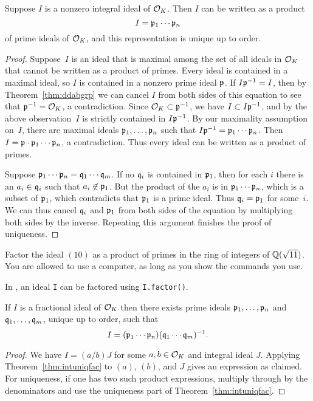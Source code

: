 \begin{theorem}\label{thm:intuniqfac}
	Suppose $I$ is a nonzero integral ideal of $\mathcal{O}_K$.  Then $I$ can
	be written as a product
	$$
		I = \mathfrak{p}_1\cdots \mathfrak{p}_n
	$$
	of prime ideals of $\mathcal{O}_K$, and this representation is unique up to
	order.
\end{theorem}
\begin{proof}
	Suppose~$I$ is an ideal that is maximal among the set of all ideals in
	$\mathcal{O}_K$ that cannot be written as a product of primes.  Every ideal is
	contained in a maximal ideal, so $I$ is contained in a nonzero prime
	ideal $\mathfrak{p}$.  If $I\mathfrak{p}^{-1} = I$, then by Theorem~\ref{thm:ddabgrp} we
	can cancel $I$ from both sides of this equation to see that
	$\mathfrak{p}^{-1}=\mathcal{O}_K$, a contradiction.  Since $\mathcal{O}_K\subset \mathfrak{p}^{-1}$,
	we have $I\subset I\mathfrak{p}^{-1}$, and by the above observation~$I$
	is strictly contained in $I\mathfrak{p}^{-1}$.
	By our maximality assumption on~$I$, there are maximal
	ideals $\mathfrak{p}_1,\ldots, \mathfrak{p}_n$ such that $I\mathfrak{p}^{-1} = \mathfrak{p}_1\cdots \mathfrak{p}_n$.
	Then $I=\mathfrak{p}\cdot \mathfrak{p}_1\cdots \mathfrak{p}_n$, a contradiction.  Thus every ideal
	can be written as a product of primes.
	
	Suppose $\mathfrak{p}_1\cdots \mathfrak{p}_n=\mathfrak{q}_1\cdots \mathfrak{q}_m$. If no $\mathfrak{q}_i$ is contained in
	$\mathfrak{p}_1$, then for each $i$ there is an $a_i\in \mathfrak{q}_i$ such that
	$a_i\not\in\mathfrak{p}_1$.  But the product of the $a_i$ is in $\mathfrak{p}_1\cdots
	\mathfrak{p}_n$, which is a subset of $\mathfrak{p}_1$, which contradicts that
	$\mathfrak{p}_1$ is a prime ideal.  Thus $\mathfrak{q}_i=\mathfrak{p}_1$ for some~$i$.  We can thus
	cancel $\mathfrak{q}_i$ and $\mathfrak{p}_1$ from both sides of the equation by multiplying
	both sides by the inverse.
	Repeating this argument finishes the proof of uniqueness.
\end{proof}

\begin{exercise}
	Factor the ideal $(10)$ as a product of primes
	in the ring of integers of $\mathbb{Q}(\sqrt{11})$. You are allowed
	to use a computer, as long as you show the commands you use.
	\begin{hint}
		In \sage, an ideal {\tt I} can be factored using {\tt I.factor()}.
	\end{hint}
\end{exercise}

\begin{theorem}\label{thm:uniqfac}
	If $I$ is a fractional ideal of $\mathcal{O}_K$ then there exists
	prime ideals $\mathfrak{p}_1,\ldots, \mathfrak{p}_n$ and $\mathfrak{q}_1,\ldots, \mathfrak{q}_m$,
	unique up to order, such that
	$$
		I = (\mathfrak{p}_1\cdots \mathfrak{p}_n)(\mathfrak{q}_1\cdots \mathfrak{q}_m)^{-1}.
	$$
\end{theorem}
\begin{proof}
	We have $I=(a/b)J$ for some $a,b\in\mathcal{O}_K$ and integral ideal $J$.
	Applying Theorem~\ref{thm:intuniqfac} to $(a)$, $(b)$, and $J$ gives
	an expression as claimed.  For uniqueness, if one has two such product
	expressions, multiply through by the denominators and use the
	uniqueness part of Theorem~\ref{thm:intuniqfac}.
\end{proof}


